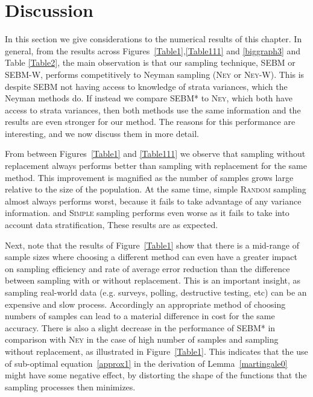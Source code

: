 \section{Discussion}
\label{sec:discussion}

In this section we give considerations to the numerical results of this chapter.
In general, from the results across Figures~\ref{Table1},\ref{Table111} and \ref{biggraph3} and Table \ref{Table2}, the main observation is that our sampling technique, SEBM or SEBM-W, 
performs competitively to Neyman sampling (\textsc{Ney} or \textsc{Ney-W}).
This is despite SEBM not having access to knowledge of strata variances, which the Neyman methods do.
If instead we compare SEBM* to \textsc{Ney}, which both have access to strata variances, then both methods use the same information and the results are even stronger for our method. 
The reasons for this performance are interesting, 
and we now discuss them in more detail.

From between Figures~\ref{Table1} and \ref{Table111} we observe that sampling without replacement always performs better than sampling with replacement for the same method. 
This improvement is magnified as the number of samples grows large relative to the size of the population. 
At the same time, simple \textsc{Random} sampling almost always performs worst, because it fails to take advantage of any variance information. and \textsc{Simple} sampling performs even worse as it fails to take into account data stratification, These results are as expected.

Next, note that the results of Figure~\ref{Table1} show that there is a mid-range of sample sizes where choosing a different method can even have a greater impact on sampling efficiency and rate of average error reduction than the difference between sampling with or without replacement.
This is an important insight, as sampling real-world data (e.g. surveys, polling, destructive testing, etc) can be an expensive and slow process.
Accordingly an appropriate method of choosing numbers of samples can lead to a material difference in cost for the same accuracy.
There is also a slight decrease in the performance of SEBM* in comparison with \textsc{Ney} in the case of high number of samples and sampling without replacement, as illustrated in Figure~\ref{Table1}. 
This indicates that the use of sub-optimal equation~\ref{approx1} in the derivation of Lemma~\ref{martingale0} might have some negative effect, by distorting the shape of the functions that the sampling processes then minimizes.


